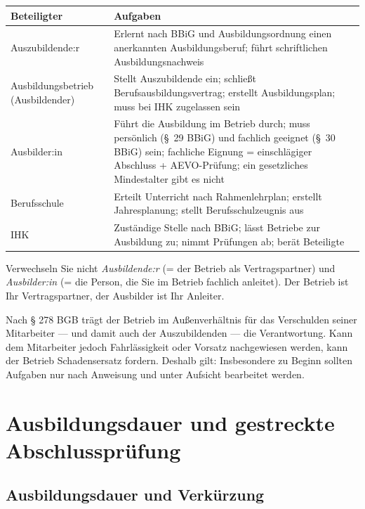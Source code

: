 \documentclass[11pt, a4paper]{article}
\begin{document}
\begin{center}
\begin{tabular}{p{3.5cm} p{9cm}}
\toprule
\textbf{Beteiligter} & \textbf{Aufgaben}\\
\midrule
Auszubildende:r & Erlernt nach BBiG und Ausbildungsordnung einen anerkannten Ausbildungsberuf; führt schriftlichen Ausbildungsnachweis\\
Ausbildungsbetrieb (Ausbildender) & Stellt Auszubildende ein; schließt Berufsausbildungsvertrag; erstellt Ausbildungsplan; muss bei IHK zugelassen sein\\
Ausbilder:in & Führt die Ausbildung im Betrieb durch; muss persönlich (§~29 BBiG) und fachlich geeignet (§~30 BBiG) sein; fachliche Eignung = einschlägiger Abschluss + AEVO-Prüfung; ein gesetzliches Mindestalter gibt es nicht\\
Berufsschule & Erteilt Unterricht nach Rahmenlehrplan; erstellt Jahresplanung; stellt Berufsschulzeugnis aus\\
IHK & Zuständige Stelle nach BBiG; lässt Betriebe zur Ausbildung zu; nimmt Prüfungen ab; berät Beteiligte\\
\bottomrule
\end{tabular}
\end{center}

\begin{merksatz}
Verwechseln Sie nicht \emph{Ausbildende:r} (= der Betrieb als Vertragspartner) und
\emph{Ausbilder:in} (= die Person, die Sie im Betrieb fachlich anleitet). Der Betrieb ist
Ihr Vertragspartner, der Ausbilder ist Ihr Anleiter.
\end{merksatz}

Nach § 278 BGB trägt der Betrieb im Außenverhältnis für das Verschulden seiner Mitarbeiter
--- und damit auch der Auszubildenden --- die Verantwortung. Kann dem Mitarbeiter jedoch
Fahrlässigkeit oder Vorsatz nachgewiesen werden, kann der Betrieb Schadensersatz fordern.
Deshalb gilt: Insbesondere zu Beginn sollten Aufgaben nur nach Anweisung und unter Aufsicht
bearbeitet werden.

\section{Ausbildungsdauer und gestreckte Abschlussprüfung}

\subsection{Ausbildungsdauer und Verkürzung}
\end{document}
